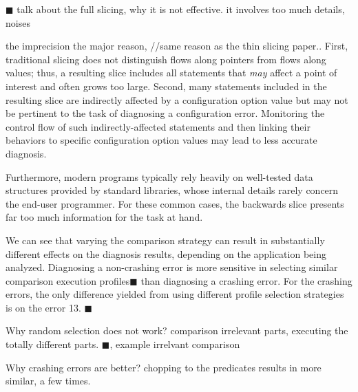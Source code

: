 $\blacksquare$ talk about the full slicing, why it is not
effective. it involves too much details, noises

the imprecision the major reason, //same reason as the thin slicing paper..
First, traditional slicing does not distinguish flows along
pointers from flows along values; thus, a resulting slice includes all statements that
\textit{may} affect a point of interest and often grows too large. Second,
many statements included in the resulting slice are indirectly
affected by a configuration option value but may not be pertinent
to the task of diagnosing a configuration error.
Monitoring the control flow of such indirectly-affected statements 
and then linking their behaviors to specific configuration option values
may lead to less accurate diagnosis.

Furthermore,
modern programs typically rely heavily on well-tested data structures
provided by standard libraries, whose internal details rarely
concern the end-user programmer. For these common cases, the
backwards slice presents far too much information for the task at
hand.


We can see that varying the comparison strategy can result in
substantially different effects on the diagnosis results,
depending on the application being analyzed. Diagnosing
a non-crashing error is more sensitive in selecting similar
comparison execution profiles$\blacksquare$ than diagnosing
a crashing error.
For the \crash crashing errors, the only difference yielded
from using different profile selection strategies is on
the error 13. $\blacksquare$

Why random selection does not work?
comparison irrelevant parts, executing the totally different parts.
$\blacksquare$, example irrelvant comparison

Why crashing errors are better? chopping to the predicates results
in more similar, a few times.

